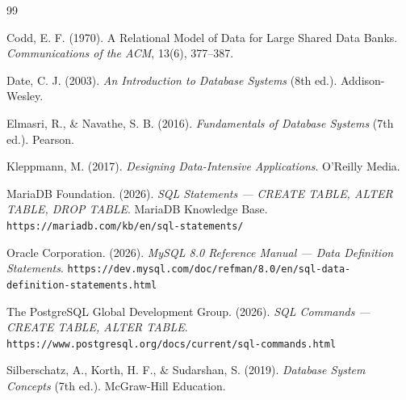 \documentclass[11pt,a4paper]{article}
\begin{document}
\begin{thebibliography}{99}

	Codd, E. F. (1970).
	A Relational Model of Data for Large Shared Data Banks.
	\textit{Communications of the ACM}, 13(6), 377--387.

	Date, C. J. (2003).
	\textit{An Introduction to Database Systems} (8th ed.).
	Addison-Wesley.

	Elmasri, R., \& Navathe, S. B. (2016).
	\textit{Fundamentals of Database Systems} (7th ed.).
	Pearson.

	Kleppmann, M. (2017).
	\textit{Designing Data-Intensive Applications}.
	O'Reilly Media.

	MariaDB Foundation. (2026).
	\textit{SQL Statements --- CREATE TABLE, ALTER TABLE,
	DROP TABLE}.
	MariaDB Knowledge Base.
	\texttt{https://mariadb.com/kb/en/sql-statements/}

	Oracle Corporation. (2026).
	\textit{MySQL 8.0 Reference Manual --- Data Definition
	Statements}.
	\texttt{https://dev.mysql.com/doc/refman/8.0/en/sql-data-definition-statements.html}

	The PostgreSQL Global Development Group. (2026).
	\textit{SQL Commands --- CREATE TABLE, ALTER TABLE}.
	\texttt{https://www.postgresql.org/docs/current/sql-commands.html}

	Silberschatz, A., Korth, H. F., \& Sudarshan, S. (2019).
	\textit{Database System Concepts} (7th ed.).
	McGraw-Hill Education.

\end{thebibliography}
\end{document}
